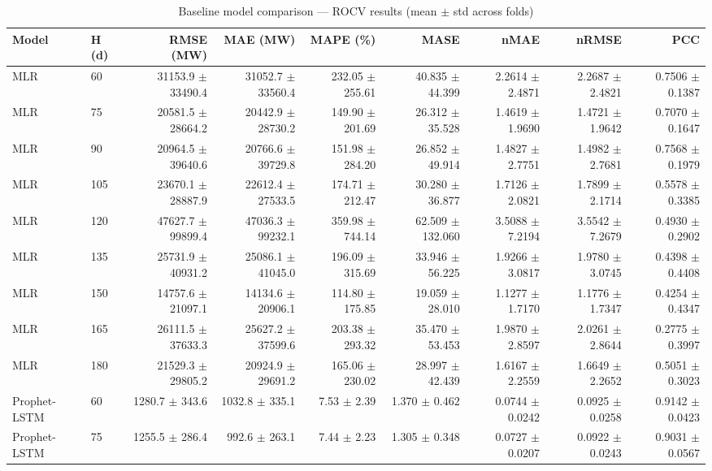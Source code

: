\begin{table}[htbp]
\centering
\caption{Baseline model comparison — ROCV results (mean $\pm$ std across folds)}
\label{tab:baseline_results}
\footnotesize
\setlength{\tabcolsep}{3pt}
\begin{tabular}{llrrrrrrr}
\toprule
Model & H (d) & RMSE (MW) & MAE (MW) & MAPE (\%) & MASE & nMAE & nRMSE & PCC \\
\midrule
MLR & 60 & 31153.9 $\pm$ 33490.4 & 31052.7 $\pm$ 33560.4 & 232.05 $\pm$ 255.61 & 40.835 $\pm$ 44.399 & 2.2614 $\pm$ 2.4871 & 2.2687 $\pm$ 2.4821 & 0.7506 $\pm$ 0.1387 \\
MLR & 75 & 20581.5 $\pm$ 28664.2 & 20442.9 $\pm$ 28730.2 & 149.90 $\pm$ 201.69 & 26.312 $\pm$ 35.528 & 1.4619 $\pm$ 1.9690 & 1.4721 $\pm$ 1.9642 & 0.7070 $\pm$ 0.1647 \\
MLR & 90 & 20964.5 $\pm$ 39640.6 & 20766.6 $\pm$ 39729.8 & 151.98 $\pm$ 284.20 & 26.852 $\pm$ 49.914 & 1.4827 $\pm$ 2.7751 & 1.4982 $\pm$ 2.7681 & 0.7568 $\pm$ 0.1979 \\
MLR & 105 & 23670.1 $\pm$ 28887.9 & 22612.4 $\pm$ 27533.5 & 174.71 $\pm$ 212.47 & 30.280 $\pm$ 36.877 & 1.7126 $\pm$ 2.0821 & 1.7899 $\pm$ 2.1714 & 0.5578 $\pm$ 0.3385 \\
MLR & 120 & 47627.7 $\pm$ 99899.4 & 47036.3 $\pm$ 99232.1 & 359.98 $\pm$ 744.14 & 62.509 $\pm$ 132.060 & 3.5088 $\pm$ 7.2194 & 3.5542 $\pm$ 7.2679 & 0.4930 $\pm$ 0.2902 \\
MLR & 135 & 25731.9 $\pm$ 40931.2 & 25086.1 $\pm$ 41045.0 & 196.09 $\pm$ 315.69 & 33.946 $\pm$ 56.225 & 1.9266 $\pm$ 3.0817 & 1.9780 $\pm$ 3.0745 & 0.4398 $\pm$ 0.4408 \\
MLR & 150 & 14757.6 $\pm$ 21097.1 & 14134.6 $\pm$ 20906.1 & 114.80 $\pm$ 175.85 & 19.059 $\pm$ 28.010 & 1.1277 $\pm$ 1.7170 & 1.1776 $\pm$ 1.7347 & 0.4254 $\pm$ 0.4347 \\
MLR & 165 & 26111.5 $\pm$ 37633.3 & 25627.2 $\pm$ 37599.6 & 203.38 $\pm$ 293.32 & 35.470 $\pm$ 53.453 & 1.9870 $\pm$ 2.8597 & 2.0261 $\pm$ 2.8644 & 0.2775 $\pm$ 0.3997 \\
MLR & 180 & 21529.3 $\pm$ 29805.2 & 20924.9 $\pm$ 29691.2 & 165.06 $\pm$ 230.02 & 28.997 $\pm$ 42.439 & 1.6167 $\pm$ 2.2559 & 1.6649 $\pm$ 2.2652 & 0.5051 $\pm$ 0.3023 \\
\midrule
Prophet-LSTM & 60 & 1280.7 $\pm$ 343.6 & 1032.8 $\pm$ 335.1 & 7.53 $\pm$ 2.39 & 1.370 $\pm$ 0.462 & 0.0744 $\pm$ 0.0242 & 0.0925 $\pm$ 0.0258 & 0.9142 $\pm$ 0.0423 \\
Prophet-LSTM & 75 & 1255.5 $\pm$ 286.4 & 992.6 $\pm$ 263.1 & 7.44 $\pm$ 2.23 & 1.305 $\pm$ 0.348 & 0.0727 $\pm$ 0.0207 & 0.0922 $\pm$ 0.0243 & 0.9031 $\pm$ 0.0567 \\

\end{tabular}
\end{table}
